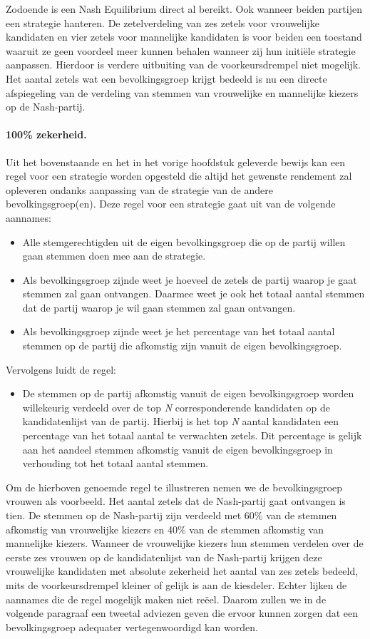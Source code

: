 Zodoende is een Nash Equilibrium direct al bereikt. Ook wanneer beiden partijen een strategie hanteren. De zetelverdeling van zes zetels voor vrouwelijke kandidaten en vier zetels voor mannelijke kandidaten is voor beiden een toestand waaruit ze geen voordeel meer kunnen behalen wanneer zij hun initi\"{e}le strategie aanpassen. Hierdoor is verdere uitbuiting van de voorkeursdrempel niet mogelijk. Het aantal zetels wat een bevolkingsgroep krijgt bedeeld is nu een directe afspiegeling van de verdeling van stemmen van vrouwelijke en mannelijke kiezers op de Nash-partij. 


\paragraph{100\% zekerheid.}
Uit het bovenstaande en het in het vorige hoofdstuk geleverde bewijs kan een regel voor een strategie worden opgesteld die altijd het gewenste rendement zal opleveren ondanks aanpassing van de strategie van de andere bevolkingsgroep(en). Deze regel voor een strategie gaat uit van de volgende aannames:
\begin{itemize}
\item
Alle stemgerechtigden uit de eigen bevolkingsgroep die op de partij willen gaan stemmen doen mee aan de strategie.
\item 
Als bevolkingsgroep zijnde weet je hoeveel de zetels de partij waarop je gaat stemmen zal gaan ontvangen. Daarmee weet je ook het totaal aantal stemmen dat de partij waarop je wil gaan stemmen zal gaan ontvangen.
\item 
Als bevolkingsgroep zijnde weet je het percentage van het totaal aantal stemmen op de partij die afkomstig zijn vanuit de eigen bevolkingsgroep.
\end{itemize}

\noindent Vervolgens luidt de regel: 
\begin{itemize}
\item
De stemmen op de partij afkomstig vanuit de eigen bevolkingsgroep worden willekeurig verdeeld over de top \textit{N} corresponderende kandidaten op de kandidatenlijst van de partij. Hierbij is het top \textit{N} aantal kandidaten een percentage van het totaal aantal te verwachten zetels. Dit percentage is gelijk aan het aandeel stemmen afkomstig vanuit de eigen bevolkingsgroep in verhouding tot het totaal aantal stemmen.
\end{itemize}

Om de hierboven genoemde regel te illustreren nemen we de bevolkingsgroep vrouwen als voorbeeld. Het aantal zetels dat de Nash-partij gaat ontvangen is tien. De stemmen op de Nash-partij zijn verdeeld met 60\% van de stemmen afkomstig van vrouwelijke kiezers en 40\% van de stemmen afkomstig van mannelijke kiezers. Wanneer de vrouwelijke kiezers hun stemmen verdelen over de eerste zes vrouwen op de kandidatenlijst van de Nash-partij krijgen deze vrouwelijke kandidaten met absolute zekerheid het aantal van zes zetels bedeeld, mits de voorkeursdrempel kleiner of gelijk is aan de kiesdeler. Echter lijken de aannames die de regel mogelijk maken niet re\"{e}el. Daarom zullen we in de volgende paragraaf een tweetal adviezen geven die ervoor kunnen zorgen dat een bevolkingsgroep adequater vertegenwoordigd kan worden.

